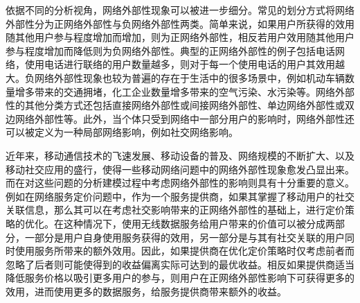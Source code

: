 
依据不同的分析视角，网络外部性现象可以被进一步细分。常见的划分方式将网络外部性分为正网络外部性与负网络外部性两类。简单来说，如果用户所获得的效用随其他用户参与程度增加而增加，则为正网络外部性，相反若用户效用随其他用户参与程度增加而降低则为负网络外部性。典型的正网络外部性的例子包括电话网络，使用电话进行联络的用户数量越多，则对于每一个使用电话的用户其效用越大。负网络外部性现象\cite{negative}也较为普遍的存在于生活中的很多场景中，例如机动车辆数量增多带来的交通拥堵，化工企业数量增多带来的空气污染、水污染等。网络外部性的其他分类方式还包括直接网络外部性或间接网络外部性、单边网络外部性或双边网络外部性等。此外，当个体只受到网络中一部分用户的影响时，网络外部性还可以被定义为一种{\kaishu 局部网络影响}，例如社交网络影响\cite{jianweibook}。



近年来，移动通信技术的飞速发展、移动设备的普及、网络规模的不断扩大、以及移动社交应用的盛行，使得一些移动网络问题中的网络外部性现象愈发凸显出来。而在对这些问题的分析建模过程中考虑网络外部性的影响则具有十分重要的意义。
例如在网络服务定价问题中，作为一个服务提供商，如果其掌握了移动用户的社交关联信息，那么其可以在考虑社交影响带来的正网络外部性的基础上，进行定价策略的优化。在这种情况下，使用无线数据服务给用户带来的价值可以被分成两部分，一部分是用户自身使用服务获得的效用，另一部分是与其有社交关联的用户同时使用服务所带来的额外效用。因此，如果提供商在优化定价策略时仅考虑前者而忽略了后者则可能使得到的收益偏离实际可达到的最优收益。相反如果提供商适当降低服务价格以吸引更多用户的参与，则用户在正网络外部性影响下可获得更多的效用，进而使用更多的数据服务，给服务提供商带来额外的收益。


